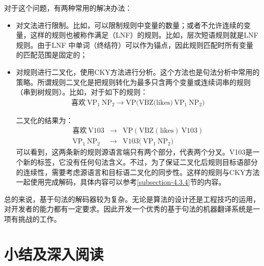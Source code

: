 \parinterval 对于这个问题，有两种常用的解决办法：
\begin{itemize}
\vspace{0.5em}
\item 对文法进行限制。比如，可以限制规则中变量的数量；或者不允许连续的变量，这样的规则也被称作满足{\small{}}（LNF）的规则。比如，层次短语规则就是LNF规则。由于LNF 中单词（终结符）可以作为锚点，因此规则匹配时所有变量的匹配范围是固定的；
\vspace{0.5em}
\item 对规则进行二叉化，使用CKY方法进行分析。这个方法也是句法分析中常用的策略。所谓规则二叉化是把规则转化为最多只含两个变量或连续词串的规则（串到树规则）。比如，对于如下的规则：
\begin{eqnarray}
\textrm{喜欢}\ \textrm{VP}_1\ \textrm{NP}_2 \rightarrow \textrm{VP(VBZ(likes)}\ \textrm{VP}_1\ \textrm{NP}_2 ) \nonumber
\end{eqnarray}

\noindent 二叉化的结果为：
\begin{eqnarray}
\textrm{喜欢}\ \textrm{V103} &\rightarrow& \textrm{VP}(\textrm{VBZ}(\textrm{likes})\ \textrm{V103} ) \nonumber \\
\textrm{VP}_1\ \textrm{NP}_2 &\rightarrow& \textrm{V103(}\ \textrm{VP}_1\ \textrm{NP}_2 ) \nonumber
\end{eqnarray}
\noindent 可以看到，这两条新的规则源语言端只有两个部分，代表两个分叉。V103是一个新的标签，它没有任何句法含义。不过，为了保证二叉化后规则目标语部分的连续性，需要考虑源语言和目标语二叉化的同步性\cite{zhang2006synchronous,Tong2009Better}。这样的规则与CKY方法一起使用完成解码，具体内容可以参考\ref{subsection-4.3.4}节的内容。
\vspace{0.5em}
\end{itemize}

\parinterval 总的来说，基于句法的解码器较为复杂。无论是算法的设计还是工程技巧的运用，对开发者的能力都有一定要求。因此开发一个优秀的基于句法的机器翻译系统是一项有挑战的工作。


\sectionnewpage
\section{小结及深入阅读}\label{section-4.5}

